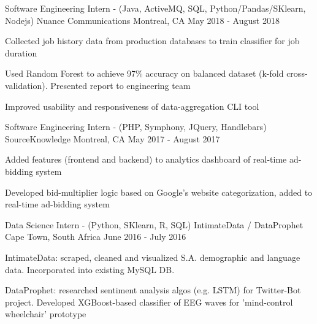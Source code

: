 


\begin{cventries}


\cventry
{Software Engineering Intern - (Java, ActiveMQ, SQL, Python/Pandas/SKlearn, Nodejs)} %
{Nuance Communications} %
{Montreal, CA} %
{May 2018 - August 2018} %
{ %
\begin{cvitems}
\item {Collected job history data from production databases to train classifier for job duration}
\item {Used Random Forest to achieve 97\% accuracy on balanced dataset (k-fold cross-validation). Presented report to engineering team}
\item {Improved usability and responsiveness of data-aggregation CLI tool}
\end{cvitems}
}


\cventry
{Software Engineering Intern - (PHP, Symphony, JQuery, Handlebars)} %
{SourceKnowledge} %
{Montreal, CA} %
{May 2017 - August 2017} %
{ %
\begin{cvitems}
\item {Added features (frontend and backend) to analytics dashboard of real-time ad-bidding system}
\item {Developed bid-multiplier logic based on Google's website categorization, added to real-time ad-bidding system}
\end{cvitems}
}


\cventry
{Data Science Intern - (Python, SKlearn, R, SQL)} %
{IntimateData / DataProphet} %
{Cape Town, South Africa} %
{June 2016 - July 2016} %
{ %
\begin{cvitems}
\item {IntimateData: scraped, cleaned and visualized S.A. demographic and language data. Incorporated into existing MySQL DB.}
\item {DataProphet: researched sentiment analysis algos (e.g. LSTM) for Twitter-Bot project. Developed XGBoost-based classifier of EEG waves for 'mind-control wheelchair' prototype}
\end{cvitems} 
}


\end{cventries}
